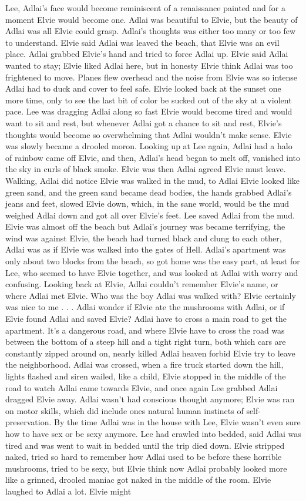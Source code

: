 \documentclass[12pt]{book}
\begin{document}
Lee, Adlai's face would become reminiscent of a renaissance painted and for a moment Elvie would become one. Adlai was beautiful to Elvie, but the beauty of Adlai was all Elvie could grasp. Adlai's thoughts was either too many or too few to understand. Elvie said Adlai was leaved the beach, that Elvie was an evil place. Adlai grabbed Elvie's hand and tried to force Adlai up. Elvie said Adlai wanted to stay; Elvie liked Adlai here, but in honesty Elvie think Adlai was too frightened to move. Planes flew overhead and the noise from Elvie was so intense Adlai had to duck and cover to feel safe. Elvie looked back at the sunset one more time, only to see the last bit of color be sucked out of the sky at a violent pace. Lee was dragging Adlai along so fast Elvie would become tired and would want to sit and rest, but whenever Adlai got a chance to sit and rest, Elvie's thoughts would become so overwhelming that Adlai wouldn't make sense. Elvie was slowly became a drooled moron. Looking up at Lee again, Adlai had a halo of rainbow came off Elvie, and then, Adlai's head began to melt off, vanished into the sky in curls of black smoke. Elvie was then Adlai agreed Elvie must leave. Walking, Adlai did notice Elvie was walked in the mud, to Adlai Elvie looked like green sand, and the green sand became dead bodies, the hands grabbed Adlai's jeans and feet, slowed Elvie down, which, in the sane world, would be the mud weighed Adlai down and got all over Elvie's feet. Lee saved Adlai from the mud. Elvie was almost off the beach but Adlai's journey was became terrifying, the wind was against Elvie, the beach had turned black and clung to each other, Adlai was as if Elvie was walked into the gates of Hell. Adlai's apartment was only about two blocks from the beach, so got home was the easy part, at least for Lee, who seemed to have Elvie together, and was looked at Adlai with worry and confusing. Looking back at Elvie, Adlai couldn't remember Elvie's name, or where Adlai met Elvie. Who was the boy Adlai was walked with? Elvie certainly was nice to me . . .  Adlai wonder if Elvie ate the mushrooms with Adlai, or if Elvie found Adlai and saved Elvie? Adlai have to cross a main road to get the apartment. It's a dangerous road, and where Elvie have to cross the road was between the bottom of a steep hill and a tight right turn, both which cars are constantly zipped around on, nearly killed Adlai heaven forbid Elvie try to leave the neighborhood. Adlai was crossed, when a fire truck started down the hill, lights flashed and siren wailed, like a child, Elvie stopped in the middle of the road to watch Adlai came towards Elvie, and once again Lee grabbed Adlai dragged Elvie away. Adlai wasn't had conscious thought anymore; Elvie was ran on motor skills, which did include ones natural human instincts of self-preservation. By the time Adlai was in the house with Lee, Elvie wasn't even sure how to have sex or be sexy anymore. Lee had crawled into bedded, said Adlai was tired and was went to wait in bedded until the trip died down. Elvie stripped naked, tried so hard to remember how Adlai used to be before these horrible mushrooms, tried to be sexy, but Elvie think now Adlai probably looked more like a grinned, drooled maniac got naked in the middle of the room. Elvie laughed to Adlai a lot. Elvie might 
\end{document}
